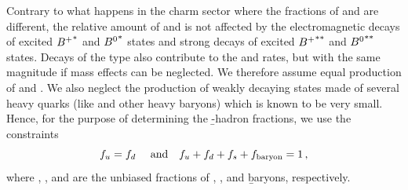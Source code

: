 Contrary to what happens in the charm sector where the fractions of 
 and  are different, the relative amount 
of \Bu and \Bd is not affected by the electromagnetic decays of 
excited ${B^+}^*$ and ${B^0}^*$ states and strong decays of excited 
${B^+}^{**}$ and ${B^0}^{**}$ states. Decays of the type 
 also contribute to the \Bu and \Bd rates, 
but with the same magnitude if mass effects can be neglected.  
We therefore assume equal production of \Bu and \Bd. We also  
neglect the production of weakly decaying states
made of several heavy quarks (like \Bc and other heavy baryons) 
which is known to be very small. Hence, for the purpose of determining 
the \b-hadron fractions, we use the constraints
\begin{equation}
\fBu = \fBd ~~~~\mbox{and}~~~ \fBu + \fBd + \fBs + \fbb = 1 \,,
\labe{constraints}
\end{equation}
where \fBu, \fBd, \fBs and \fbb
are the unbiased fractions of \Bu, \Bd, \Bs and \b baryons, respectively.

